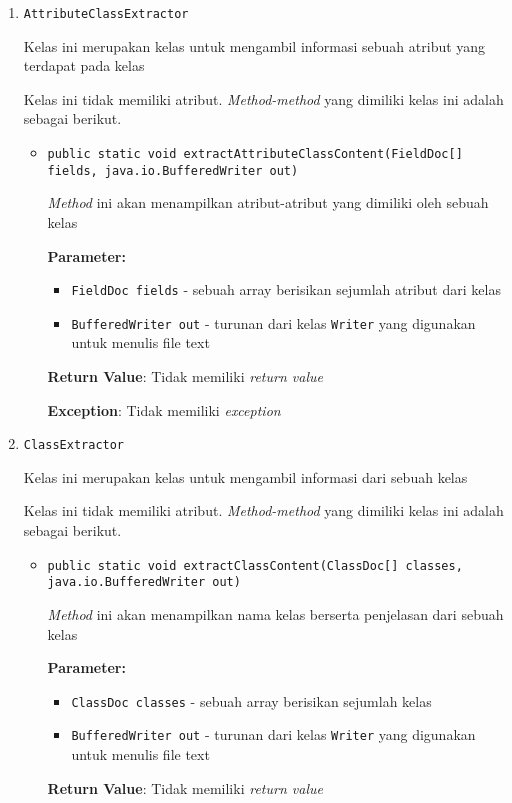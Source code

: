 \documentclass{article}
\begin{document}
\begin{enumerate}
\item \texttt{AttributeClassExtractor}

Kelas ini merupakan kelas untuk mengambil informasi sebuah atribut yang
 terdapat pada kelas

Kelas ini tidak memiliki atribut. \textit{Method-method} yang dimiliki kelas ini adalah sebagai berikut.
\begin{itemize}
\item \texttt{public static void extractAttributeClassContent(FieldDoc[] fields, java.io.BufferedWriter out)}

\textit{Method} ini akan menampilkan atribut-atribut yang dimiliki oleh
 sebuah kelas

\textbf{Parameter:}
\begin{itemize}
\item \texttt{FieldDoc fields} - 
sebuah array berisikan sejumlah atribut dari kelas
\item \texttt{BufferedWriter out} - 
turunan dari kelas \texttt{Writer} yang digunakan untuk menulis
 file text
\end{itemize}
\textbf{Return Value}: Tidak memiliki \textit{return value}

\textbf{Exception}: Tidak memiliki \textit{exception}

\end{itemize}
\item \texttt{ClassExtractor}

Kelas ini merupakan kelas untuk mengambil informasi dari sebuah kelas

Kelas ini tidak memiliki atribut. \textit{Method-method} yang dimiliki kelas ini adalah sebagai berikut.
\begin{itemize}
\item \texttt{public static void extractClassContent(ClassDoc[] classes, java.io.BufferedWriter out)}

\textit{Method} ini akan menampilkan nama kelas berserta penjelasan dari
 sebuah kelas

\textbf{Parameter:}
\begin{itemize}
\item \texttt{ClassDoc classes} - 
sebuah array berisikan sejumlah kelas
\item \texttt{BufferedWriter out} - 
turunan dari kelas \texttt{Writer} yang digunakan untuk menulis
                file text
\end{itemize}
\textbf{Return Value}: Tidak memiliki \textit{return value}


\end{itemize}
\end{enumerate}
\end{document}
